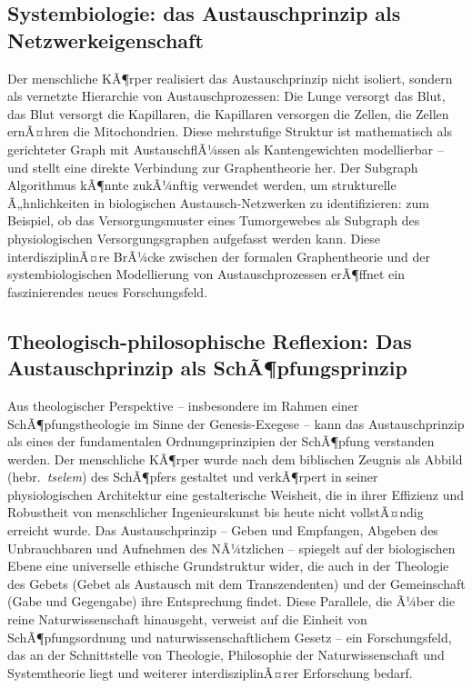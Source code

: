﻿\documentclass[a4paper,12pt]{article}
\theoremstyle{definition}
\begin{document}
\subsection{Systembiologie: das Austauschprinzip als Netzwerkeigenschaft}

Der menschliche KÃ¶rper realisiert das Austauschprinzip nicht isoliert, sondern als
vernetzte Hierarchie von Austauschprozessen: Die Lunge versorgt das Blut, das Blut
versorgt die Kapillaren, die Kapillaren versorgen die Zellen, die Zellen ernÃ¤hren
die Mitochondrien. Diese mehrstufige Struktur ist mathematisch als gerichteter Graph
mit AustauschflÃ¼ssen als Kantengewichten modellierbar -- und stellt eine direkte
Verbindung zur Graphentheorie her. Der Subgraph Algorithmus \cite{epp2026subgraph}
kÃ¶nnte zukÃ¼nftig verwendet werden, um strukturelle Ã„hnlichkeiten in biologischen
Austausch-Netzwerken zu identifizieren: zum Beispiel, ob das Versorgungsmuster eines
Tumorgewebes als Subgraph des physiologischen Versorgungsgraphen aufgefasst werden kann.
Diese interdisziplinÃ¤re BrÃ¼cke zwischen der formalen Graphentheorie und der
systembiologischen Modellierung von Austauschprozessen erÃ¶ffnet ein faszinierendes
neues Forschungsfeld.

\subsection{Theologisch-philosophische Reflexion: Das Austauschprinzip als SchÃ¶pfungsprinzip}

Aus theologischer Perspektive -- insbesondere im Rahmen einer SchÃ¶pfungstheologie
im Sinne der Genesis-Exegese -- kann das Austauschprinzip als eines der fundamentalen
Ordnungsprinzipien der SchÃ¶pfung verstanden werden. Der menschliche KÃ¶rper wurde
nach dem biblischen Zeugnis als Abbild (hebr.\ \emph{tselem}) des SchÃ¶pfers gestaltet
und verkÃ¶rpert in seiner physiologischen Architektur eine gestalterische Weisheit, die
in ihrer Effizienz und Robustheit von menschlicher Ingenieurskunst bis heute nicht
vollstÃ¤ndig erreicht wurde. Das Austauschprinzip -- Geben und Empfangen, Abgeben des
Unbrauchbaren und Aufnehmen des NÃ¼tzlichen -- spiegelt auf der biologischen Ebene
eine universelle ethische Grundstruktur wider, die auch in der Theologie des Gebets
(Gebet als Austausch mit dem Transzendenten) und der Gemeinschaft (Gabe und Gegengabe)
ihre Entsprechung findet. Diese Parallele, die Ã¼ber die reine Naturwissenschaft
hinausgeht, verweist auf die Einheit von SchÃ¶pfungsordnung und
naturwissenschaftlichem Gesetz -- ein Forschungsfeld, das an der Schnittstelle von
Theologie, Philosophie der Naturwissenschaft und Systemtheorie liegt und weiterer
interdisziplinÃ¤rer Erforschung bedarf.
\end{document}

